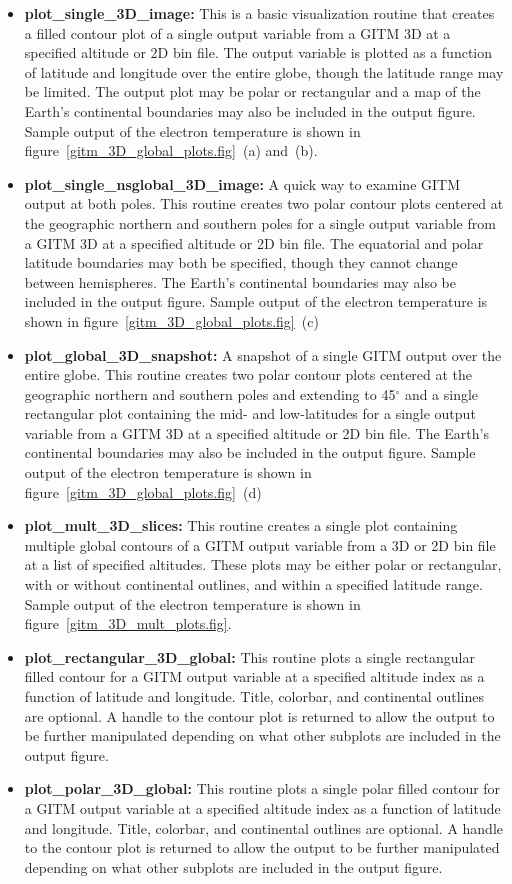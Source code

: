\begin{itemize}
\item[]{{\bf plot\_single\_3D\_image:}  This is a basic visualization routine that creates a filled contour plot of a single output variable from a GITM 3D at a specified altitude or 2D bin file.  The output variable is plotted as a function of latitude and longitude over the entire globe, though the latitude range may be limited.  The output plot may be polar or rectangular and a map of the Earth's continental boundaries may also be included in the output figure.  Sample output of the electron temperature is shown in figure~\ref{gitm_3D_global_plots.fig}~(a) and~(b).}
\item[]{{\bf plot\_single\_nsglobal\_3D\_image:}  A quick way to examine GITM output at both poles.  This routine creates two polar contour plots centered at the geographic northern and southern poles for a single output variable from a GITM 3D at a specified altitude or 2D bin file.  The equatorial and polar latitude boundaries may both be specified, though they cannot change between hemispheres.  The Earth's continental boundaries may also be included in the output figure.  Sample output of the electron temperature is shown in figure~\ref{gitm_3D_global_plots.fig}~(c)}
\item[]{{\bf plot\_global\_3D\_snapshot:}  A snapshot of a single GITM output over the entire globe.  This routine creates two polar contour plots centered at the geographic northern and southern poles and extending to 45$^\circ$ and a single rectangular plot containing the mid- and low-latitudes for a single output variable from a GITM 3D at a specified altitude or 2D bin file.  The Earth's continental boundaries may also be included in the output figure.  Sample output of the electron temperature is shown in figure~\ref{gitm_3D_global_plots.fig}~(d)}
\item[]{{\bf plot\_mult\_3D\_slices:}  This routine creates a single plot containing multiple global contours of a GITM output variable from a 3D or 2D bin file at a list of specified altitudes.  These plots may be either polar or rectangular, with or without continental outlines, and within a specified latitude range.  Sample output of the electron temperature is shown in figure~\ref{gitm_3D_mult_plots.fig}.}
\item[]{{\bf plot\_rectangular\_3D\_global:} This routine plots a single rectangular filled contour for a GITM output variable at a specified altitude index as a function of latitude and longitude.  Title, colorbar, and continental outlines are optional.  A handle to the contour plot is returned to allow the output to be further manipulated depending on what other subplots are included in the output figure.} 
\item[]{{\bf plot\_polar\_3D\_global:} This routine plots a single polar filled contour for a GITM output variable at a specified altitude index as a function of latitude and longitude.  Title, colorbar, and continental outlines are optional.  A handle to the contour plot is returned to allow the output to be further manipulated depending on what other subplots are included in the output figure.} 
\end{itemize}

